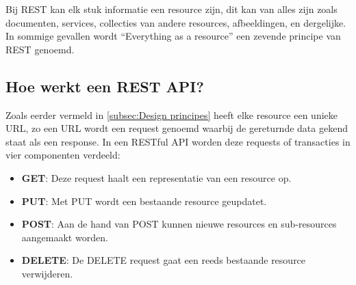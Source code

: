 Bij REST kan elk stuk informatie een resource zijn, dit kan van alles zijn zoals documenten, services, collecties van andere resources, afbeeldingen, en dergelijke. In sommige gevallen wordt “Everything as a resource”  een zevende principe van REST genoemd. 

\subsection{Hoe werkt een REST API?}
\label{subsec:Hoe werkt een RESTful API?}

Zoals eerder vermeld in \ref{subsec:Design principes} heeft elke resource een unieke URL, zo een URL wordt een request genoemd waarbij de gereturnde data gekend staat als een response. In een RESTful API worden deze requests of transacties in vier componenten verdeeld:

\begin{itemize}
    \item \textbf{GET}: Deze request haalt een representatie van een resource op.
    \item \textbf{PUT}: Met PUT wordt een bestaande resource geupdatet.
    \item \textbf{POST}: Aan de hand van POST kunnen nieuwe resources en sub-resources aangemaakt worden.
    \item \textbf{DELETE}: De DELETE request gaat een reeds bestaande resource verwijderen.
\end{itemize}




